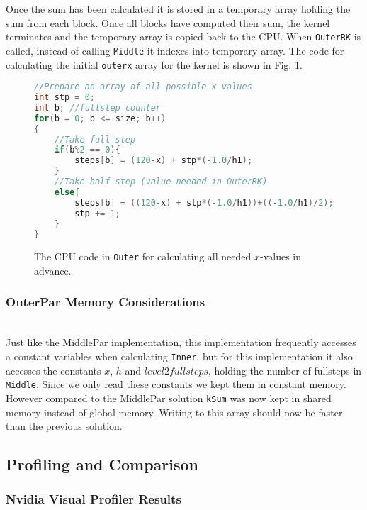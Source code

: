 Once the sum has been calculated it is stored in a temporary array holding the sum from each block. Once all blocks have computed their sum, the kernel terminates and the temporary array is copied back to the CPU. When \texttt{OuterRK} is called, instead of calling \texttt{Middle} it indexes into temporary array. The code for calculating the initial \texttt{outerx} array for the kernel is shown in Fig. \ref{fig:outerparcpu}.

\begin{figure}[ht]
\begin{lstlisting}[language=c]
//Prepare an array of all possible x values
int stp = 0;
int b; //fullstep counter
for(b = 0; b <= size; b++)
{
	//Take full step
	if(b%2 == 0){
		steps[b] = (120-x) + stp*(-1.0/h1);
	}
	//Take half step (value needed in OuterRK)
	else{
		steps[b] = ((120-x) + stp*(-1.0/h1))+((-1.0/h1)/2);
		stp += 1;
	}
}
\end{lstlisting}
\caption{The CPU code in \texttt{Outer} for calculating all needed $x$-values in advance.}
\label{fig:outerparcpu}
\end{figure}

\subsubsection{OuterPar Memory Considerations} \hfill \\
Just like the MiddlePar implementation, this implementation frequently accesses a constant variables when calculating \texttt{Inner}, but for this implementation it also accesses the constants $x$, $h$ and $level2fullsteps$, holding the number of fullsteps in \texttt{Middle}. Since we only read these constants we kept them in constant memory.\\

However compared to the MiddlePar solution \texttt{kSum} was now kept in shared memory instead of global memory. Writing to this array should now be faster than the previous solution.

\subsection{Profiling and Comparison}
\subsubsection{Nvidia Visual Profiler Results} \hfill \\
\label{sec:profiler}

